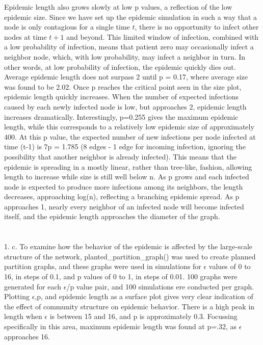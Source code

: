\documentclass[11pt, oneside]{article}   	%
\begin{document}
\indent Epidemic length also grows slowly at low p values, a reflection of the low epidemic size.  Since we have set up the epidemic simulation in such a way that a node is only contagious for a single time $t$, there is no opportunity to infect other nodes at time $t+1$ and beyond.  This limited window of infection, combined with a low probability of infection, means that patient zero may occasionally infect a neighbor node, which, with low probability, may infect a neighbor in turn.  In other words, at low probability of infection, the epidemic quickly dies out.  Average epidemic length does not surpass 2 until p =  0.17, where average size was found to be 2.02.  Once p reaches the critical point seen in the size plot, epidemic length quickly increases.  When the number of expected infections caused by each newly infected node is low, but approaches 2, epidemic length increases dramatically.  Interestingly, p=0.255 gives the maximum epidemic length, while this corresponds to a relatively low epidemic size of approximately 400.  At this p value, the expected number of new infections per node infected at time (t-1) is 7p = 1.785 (8 edges - 1 edge for incoming infection, ignoring the possibility that another neighbor is already infected).  This means that the epidemic is spreading in a mostly linear, rather than tree-like, fashion, allowing length to increase while size is still well below n.  As p grows and each infected node is expected to produce more infections among its neighbors, the length decreases, approaching log(n), reflecting a branching epidemic spread.  As p approaches 1, nearly every neighbor of an infected node will become infected itself, and the epidemic length approaches the diameter of the graph.\\\\\\
1. c.  To examine how the behavior of the epidemic is affected by the large-scale structure of the network, planted\_partition\_graph() was used to create planned partition graphs, and these graphs were used in simulations for $\epsilon$ values of 0 to 16, in steps of 0.1, and p values of 0 to 1, in steps of 0.01.  100 graphs were generated for each $\epsilon$/p value pair, and 100 simulations ere conducted per graph.  Plotting $\epsilon$,p, and epidemic length as a surface plot gives very clear indication of the effect of community structure on epidemic behavior.  There is a high peak in length when $\epsilon$ is between 15 and 16, and p is approximately 0.3.  Focussing specifically in this area, maximum epidemic length was found at p=.32, as $\epsilon$ approaches 16.\\
\end{document}

